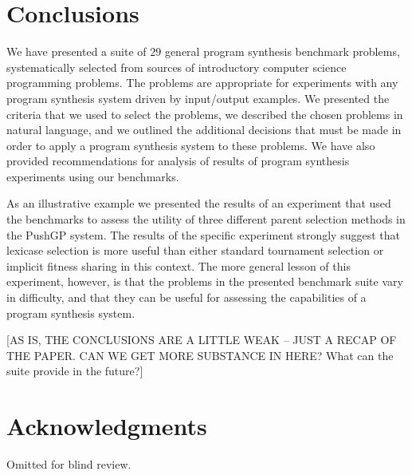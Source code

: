 \documentclass{sig-alternate}
\begin{document}
\section{Conclusions}

We have presented a suite of $29$ general program synthesis benchmark problems, systematically selected from sources of introductory computer science programming problems. 
The problems are appropriate for experiments with any program synthesis system driven by input/output examples. 
We presented the criteria that we used to select the problems, we described the chosen problems in natural language, and we outlined the additional decisions that must be made in order to apply a program synthesis system to these problems. We have also provided recommendations for analysis of results of program synthesis experiments using our benchmarks.

As an illustrative example we presented the results of an experiment that used the benchmarks to assess the utility of three different parent selection methods in the PushGP system.%
The results of the specific experiment strongly suggest that lexicase selection %
 is more useful than either standard tournament selection or implicit fitness sharing %
 in this context. The more general lesson of this experiment, however, is that the problems in the presented benchmark suite vary in difficulty, and that they can be useful for assessing the capabilities of a program synthesis system.

[AS IS, THE CONCLUSIONS ARE A LITTLE WEAK -- JUST A RECAP OF THE PAPER. CAN WE GET MORE SUBSTANCE IN HERE? What can the suite provide in the future?]


\section{Acknowledgments}
Omitted for blind review.
\end{document}
